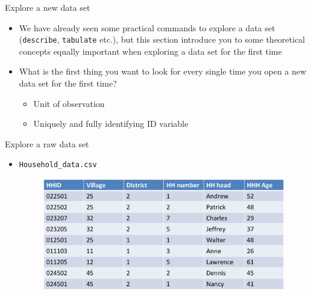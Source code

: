 \documentclass[aspectratio=169]{beamer}
\begin{document}
\begin{frame}{Explore a new data set}
	\begin{itemize}
		\item We have already seen some practical commands to explore a data set (\texttt{describe}, \texttt{tabulate} etc.), but this section introduce you to some theoretical concepts equally important when exploring a data set for the first time
		\item What is the first thing you want to look for every single time you open a new data set for the first time?
		\begin{itemize}
			\item Unit of observation
			\item Uniquely and fully identifying ID variable
		\end{itemize}
	\end{itemize}
\end{frame}



\begin{frame}{Explore a raw data set}
	\begin{itemize}
		\item \texttt{Household\_data.csv}
		\begin{figure}
			\centering
			\includegraphics[width=\linewidth]{img/raw1}
		\end{figure}
	\end{itemize}
\end{frame}
\end{document}
